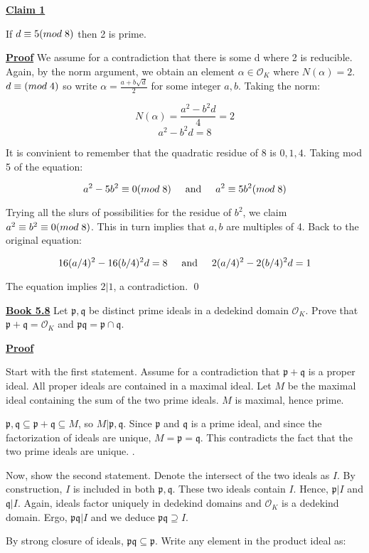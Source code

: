\documentclass{article}
\newcommand{\new}[1]{
    \vspace{2mm}
    \noindent
    \textbf{
    \underline{#1}}
}
\def\_{{\hspace{1mm}}}
\def\contradiction{{\lightning}}
\newcommand{\Proof}{{
    \vspace{2mm}
    \noindent
    \textbf{
    \underline{Proof}}
}
}
\newcommand{\textAnd}{
    \hspace{5mm}
    \textrm{and}
    \hspace{5mm}
}
\newcommand{\<}{{
    \langle
}}
\newcommand{\ringInt}{
    {\mathcal{O}}
}
\newcommand{\pideal}{
    {{\mathfrak{p}}}
}
\newcommand{\qideal}{
    {{\mathfrak{q}}}
}
\begin{document}
\new{Claim 1}
If $d \equiv 5 (mod\_8)$ then 2 is prime. 

\Proof We assume for a contradiction that there is some d where 
2 is reducible. Again, by the norm argument, we obtain an 
element $\alpha \in \ringInt_K$ where $N(\alpha) = 2$. 
$d \equiv (mod\_4)$ so write $\alpha = \frac{a+b\sqrt{d}}{2}$
for some integer $a, b$. Taking the norm:

\[
    N(\alpha) = \frac{a^2-b^2d}{4} = 2
\]
\[
    a^2-b^2d = 8
\]

It is convinient to remember that the quadratic residue of 
8 is $0, 1, 4$. Taking mod 5 of the equation:

\[
    a^2-5b^2 \equiv 0 (mod\_8)
    \textAnd
    a^2 \equiv 5b^2 (mod\_8)
\]

Trying all the slurs of possibilities for the residue of $b^2$, 
we claim $a^2 \equiv b^2 \equiv 0 (mod\_8)$. This in turn implies 
that $a, b$ are multiples of 4. Back to the original equation:


\[
    16(a/4)^2-16(b/4)^2d = 8
    \textAnd
    2(a/4)^2-2(b/4)^2d=1
\]

The equation implies $2|1$, a contradiction. \contradiction \qed


\newpage
\new{Book 5.8} Let $\pideal, \qideal$ be distinct prime ideals in 
a dedekind domain $\ringInt_K$. Prove that $\pideal + \qideal = \ringInt_K$
and $\pideal \qideal = \pideal \cap \qideal$. 

\Proof 
Start with the first statement. Assume for a contradiction that 
$\pideal + \qideal$ is a proper ideal. All proper ideals are 
contained in a maximal ideal. Let $M$ be the maximal ideal containing 
the sum of the two prime ideals. $M$ is maximal, hence prime. 

$\pideal, \qideal \subseteq \pideal + \qideal \subseteq M$, so 
$M|\pideal, \qideal$. Since $\pideal$ and $\qideal$ is a prime ideal, 
and since the factorization of ideals are unique, $M = \pideal = \qideal$. 
This contradicts the fact that the two prime ideals are unique. 
\checkmark. 

Now, show the second statement. Denote the intersect of the two 
ideals as $I$. By construction, $I$ is included in both 
$\pideal, \qideal$. These two ideals contain $I$. Hence, $\pideal|I$ and $\qideal|I$. 
Again, ideals factor uniquely in dedekind domains and $\ringInt_K$ 
is a dedekind domain. Ergo, $\pideal \qideal | I$ and we deduce 
$\pideal \qideal \supseteq I$. 

By strong closure of ideals, $\pideal\qideal \subseteq \pideal$. 
Write any element in the product ideal as:
\end{document}
